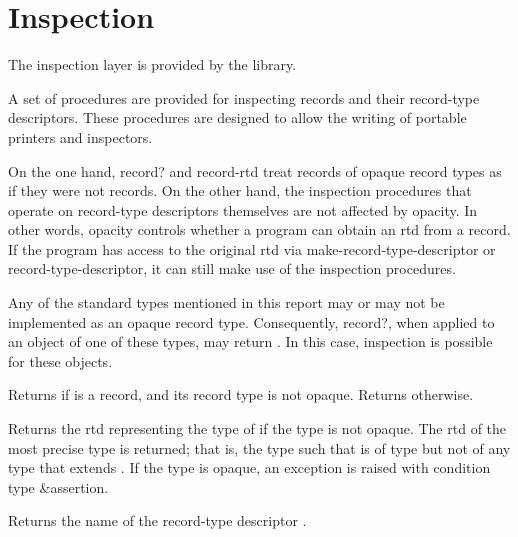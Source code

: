 \section{Inspection}

The inspection layer is provided by the
 library.

A set of procedures are provided for inspecting records and their
record-type descriptors. These procedures are designed to allow the
writing of portable printers and inspectors.

On the one hand, {\cf record?} and {\cf record-rtd} treat records of opaque
record types as if they were not records. On the other hand, the
inspection procedures that operate on record-type descriptors
themselves are not affected by opacity. In other words, opacity
controls whether a program can obtain an rtd from a record. If the
program has access to the original rtd via {\cf
  make-record-type-descriptor} or {\cf record-type-descriptor}, it can
still make use of the inspection procedures.

Any of the standard types mentioned in this report may or may not be
implemented as an opaque record type.  Consequently, {\cf record?},
when applied to an object of one of these types, may return
\schtrue{}.  In this case, inspection is possible for these objects.

\begin{entry}{%
}
   
Returns \schtrue{} if  is a record, and its record type is
not opaque. Returns \schfalse{} otherwise.  
\end{entry}

\begin{entry}{%
}
   
Returns the rtd representing the type of  if the type is not
opaque. The rtd of the most precise type is returned; that is, the
type  such that  is of type  but not of any
type that extends .  If the type is opaque, an exception is
raised with condition type {\cf\&assertion}.
\end{entry}

\begin{entry}{%
}
   
Returns the name of the record-type descriptor .
\end{entry}   

